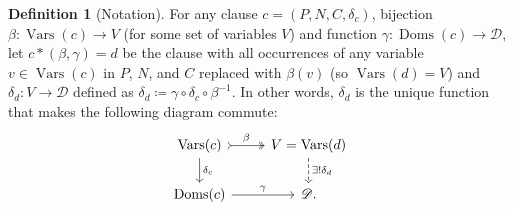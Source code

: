 \documentclass{article}
\theoremstyle{definition}
\newtheorem{definition}{Definition}
\DeclareMathOperator{\Doms}{Doms}
\DeclareMathOperator{\Vars}{Vars}
\begin{document}
\begin{definition}[Notation]
  For any clause $c = (P, N, C, \delta_c)$, bijection $\beta\colon \Vars(c) \to V$ (for some set of variables $V$) and function $\gamma\colon \Doms(c) \to \mathscr{D}$, let $c \ast (\beta, \gamma) = d$ be the clause with all occurrences of any variable $v \in \Vars(c)$ in $P$, $N$, and $C$ replaced with $\beta(v)$ (so $\Vars(d) = V$) and $\delta_d\colon V \to \mathscr{D}$ defined as $\delta_d \coloneqq \gamma \circ \delta_c \circ \beta^{-1}$. In other words, $\delta_d$ is the unique function that makes the following diagram commute:
  \[
  \begin{tikzcd}
    \Vars(c) \ar[r, tail, two heads, "\beta"] \arrow{d}{\delta_c} & V = \Vars(d) \ar[d, dashed, "\exists!\delta_d"] \\
    \Doms(c) \arrow{r}{\gamma} & \mathscr{D}.
  \end{tikzcd}
  \]
\end{definition}
\end{document}
